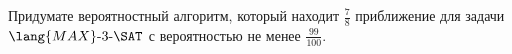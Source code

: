 Придумате вероятностный алгоритм, который находит $\frac{7}{8}$ приближение для задачи $\lang{MAX}\text{-}3\text{-}\SAT$ с
вероятностью не менее $\frac{99}{100}$.